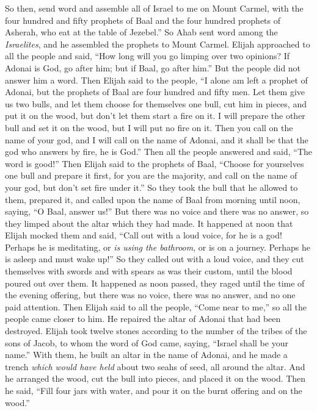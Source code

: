 \begin{biblechapter}
\verse So then, send word and assemble all of Israel to me on Mount Carmel, with the four hundred and fifty prophets of Baal and the four hundred prophets of Asherah, who eat at the table of Jezebel.”
\verse So Ahab sent word among the \textit{Israelites}, and he assembled the prophets to Mount Carmel.
\verse Elijah approached to all the people and said, “How long will you go limping over two opinions? If Adonai is God, go after him; but if Baal, go after him.” But the people did not answer him a word.
\verse Then Elijah said to the people, “I alone am left a prophet of Adonai, but the prophets of Baal are four hundred and fifty men.
\verse Let them give us two bulls, and let them choose for themselves one bull, cut him in pieces, and put it on the wood, but don’t let them start a fire on it. I will prepare the other bull and set it on the wood, but I will put no fire on it.
\verse Then you call on the name of your god, and I will call on the name of Adonai, and it shall be that the god who answers by fire, he is God.” Then all the people answered and said, “The word is good!”
\verse Then Elijah said to the prophets of Baal, “Choose for yourselves one bull and prepare it first, for you are the majority, and call on the name of your god, but don’t set fire under it.”
\verse So they took the bull that he allowed to them, prepared it, and called upon the name of Baal from morning until noon, saying, “O Baal, answer us!” But there was no voice and there was no answer, so they limped about the altar which they had made.
\verse It happened at noon that Elijah mocked them and said, “Call out with a loud voice, for he is a god! Perhaps he is meditating, or \textit{is using the bathroom}, or is on a journey. Perhaps he is asleep and must wake up!”
\verse So they called out with a loud voice, and they cut themselves with swords and with spears as was their custom, until the blood poured out over them.
\verse It happened as noon passed, they raged until the time of the evening offering, but there was no voice, there was no answer, and no one paid attention.
\verse Then Elijah said to all the people, “Come near to me,” so all the people came closer to him. He repaired the altar of Adonai that had been destroyed.
\verse Elijah took twelve stones according to the number of the tribes of the sons of Jacob, to whom the word of God came, saying, “Israel shall be your name.”
\verse With them, he built an altar in the name of Adonai, and he made a trench \textit{which would have held} about two seahs of seed, all around the altar.
\verse And he arranged the wood, cut the bull into pieces, and placed it on the wood. Then he said, “Fill four jars with water, and pour it on the burnt offering and on the wood.”

\end{biblechapter}
